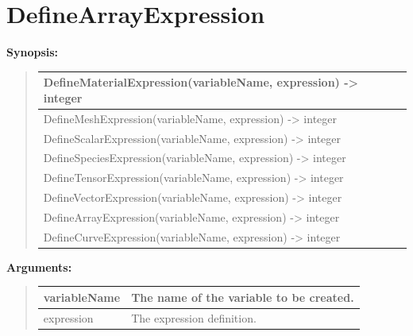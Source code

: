 \documentclass[letterpaper,10pt,english]{sphinxmanual}
\begin{document}
\section{DefineArrayExpression}
\label{functions:definearrayexpression}
\begin{DUlineblock}{0em}
\item[] \textbf{Synopsis:}
\end{DUlineblock}
\begin{quote}

\begin{tabulary}{\linewidth}{|L|}
\hline

DefineMaterialExpression(variableName, expression) -\textgreater{} integer
\\
\hline
DefineMeshExpression(variableName, expression) -\textgreater{} integer
\\
\hline
DefineScalarExpression(variableName, expression) -\textgreater{} integer
\\
\hline
DefineSpeciesExpression(variableName, expression) -\textgreater{} integer
\\
\hline
DefineTensorExpression(variableName, expression) -\textgreater{} integer
\\
\hline
DefineVectorExpression(variableName, expression) -\textgreater{} integer
\\
\hline
DefineArrayExpression(variableName, expression) -\textgreater{} integer
\\
\hline
DefineCurveExpression(variableName, expression) -\textgreater{} integer
\\
\hline\end{tabulary}

\end{quote}

\begin{DUlineblock}{0em}
\item[] 
\item[] \textbf{Arguments:}
\end{DUlineblock}
\begin{quote}

\begin{tabulary}{\linewidth}{|L|L|}
\hline

variableName
 & 
The name of the variable to be created.
\\
\hline
expression
 & 
The expression definition.
\\
\hline\end{tabulary}

\end{quote}
\end{document}
